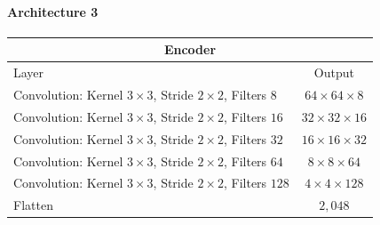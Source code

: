 \paragraph{Architecture 3}

\begin{center}
    \begin{table}[H]
        \centering
        \begin{tabular}{ | l | c | }
            \multicolumn{2}{c}{Encoder} \\ \hline
            Layer & Output\\ \hline
            Convolution: Kernel $3\times3$, Stride $2\times2$, Filters $8  $    & $64\times 64\times 8  $    \\  
            Convolution: Kernel $3\times3$, Stride $2\times2$, Filters $16 $    & $32\times 32\times 16 $    \\
            Convolution: Kernel $3\times3$, Stride $2\times2$, Filters $32 $    & $16\times 16\times 32 $    \\
            Convolution: Kernel $3\times3$, Stride $2\times2$, Filters $64 $    & $8\times 8\times   64 $    \\
            Convolution: Kernel $3\times3$, Stride $2\times2$, Filters $128$    & $4\times 4\times   128$    \\
            Flatten                                                             & $2,048$                    \\
            \hline
        \end{tabular} 
    \end{table}
\end{center}
\vspace{-4em}
